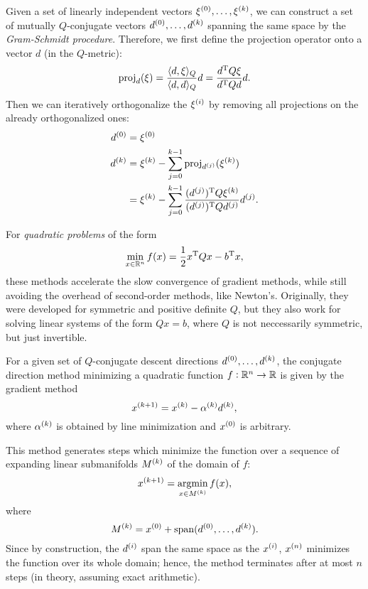 \documentclass{article}
\begin{document}
Given a set of linearly independent vectors \(\kth[0]{\xi}, \ldots, \kth{\xi}\), we can construct a
set of mutually \(Q\)-conjugate vectors \(\kth[0]{d}, \ldots, \kth{d}\) spanning the same space by
the \emph{Gram-Schmidt procedure}.  Therefore, we first define the projection operator onto a vector
\(d\) (in the \(Q\)-metric):
\begin{equation*}
  \proj_d(\xi) = \frac{\langle d, \xi \rangle_Q}{\langle d, d \rangle_Q} d
  = \frac{\T{d} Q \xi}{\T{d} Q d} d.
\end{equation*}
Then we can iteratively orthogonalize the \(\kth[i]{\xi}\) by removing all projections on the already
orthogonalized ones:
\begin{align*}
  \kth[0]{d} &= \kth[0]{\xi} \\
  \kth[k]{d} &= \kth[k]{\xi} - \sum_{j=0}^{k-1} \proj_{\kth[j]{d}}(\kth[k]{\xi}) \\
             &= \kth[k]{\xi} - \sum_{j=0}^{k-1}
               \frac{\T{(\kth[j]{d})} Q \kth[k]{\xi}}{\T{(\kth[j]{d})} Q \kth[j]{d}} \kth[j]{d}.
\end{align*}


\label{s:conjugate-direction-methods}

For \emph{quadratic problems} of the form
\begin{equation*}
  \min_{x \in \RR^n} f(x) = \frac{1}{2} \T{x}Qx - \T{b}x,
\end{equation*}
these methods accelerate the slow convergence of gradient methods, while still avoiding the overhead
of second-order methods, like Newton's.  Originally, they were developed for symmetric and positive
definite \(Q\), but they also work for solving linear systems of the form \(Qx = b\), where \(Q\) is
not neccessarily symmetric, but just invertible.

For a given set of \(Q\)-conjugate descent directions \(\kth[0]{d}, \ldots, \kth{d}\), the conjugate
direction method minimizing a quadratic function \(f: \RR^n \to \RR\) is given by the gradient
method
\begin{equation*}
  \kth[k+1]{x} = \kth{x} - \kth{\alpha}\kth{d},
\end{equation*}
where \(\kth{\alpha}\) is obtained by line minimization and \(\kth[0]{x}\) is arbitrary.

This method generates steps which minimize the function over a sequence of expanding linear
submanifolds \(\kth{M}\) of the domain of \(f\):
\begin{equation*}
  \kth[k+1]{x} = \argmin_{x \in \kth{M}} f(x),
\end{equation*}
where
\begin{equation*}
  \kth{M} = \kth[0]{x} + \Span (\kth[0]{d}, \ldots, \kth{d}).
\end{equation*}
Since by construction, the \(\kth[i]{d}\) span the same space as the \(\kth[i]{x}\), \(\kth[n]{x}\)
minimizes the function over its whole domain; hence, the method terminates after at most \(n\)
steps (in theory, assuming exact arithmetic).
\end{document}
